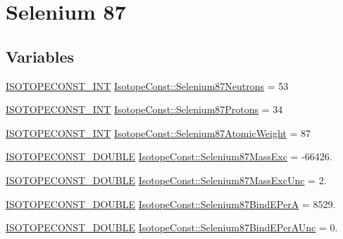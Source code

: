 \hypertarget{group___isotope_const-_selenium-_se87}{}\section{Selenium 87}
\label{group___isotope_const-_selenium-_se87}
\subsection*{Variables}
\begin{DoxyCompactItemize}
\item 
\mbox{\hyperlink{group___isotope_const-_macros_ga5f18360b3e99483a35c32d789e62621c}{I\+S\+O\+T\+O\+P\+E\+C\+O\+N\+S\+T\+\_\+\+I\+NT}} \mbox{\hyperlink{group___isotope_const-_selenium-_se87_ga31454afb7fc1f62615f207b95c50bda7}{Isotope\+Const\+::\+Selenium87\+Neutrons}} = 53
\item 
\mbox{\hyperlink{group___isotope_const-_macros_ga5f18360b3e99483a35c32d789e62621c}{I\+S\+O\+T\+O\+P\+E\+C\+O\+N\+S\+T\+\_\+\+I\+NT}} \mbox{\hyperlink{group___isotope_const-_selenium-_se87_gababb419b94bc3ac27b1ec3775664c155}{Isotope\+Const\+::\+Selenium87\+Protons}} = 34
\item 
\mbox{\hyperlink{group___isotope_const-_macros_ga5f18360b3e99483a35c32d789e62621c}{I\+S\+O\+T\+O\+P\+E\+C\+O\+N\+S\+T\+\_\+\+I\+NT}} \mbox{\hyperlink{group___isotope_const-_selenium-_se87_gafb610b8770290157e2038974c2f0e10c}{Isotope\+Const\+::\+Selenium87\+Atomic\+Weight}} = 87
\item 
\mbox{\hyperlink{group___isotope_const-_macros_ga8f45a7272ce02c0b4c65c44636ed719a}{I\+S\+O\+T\+O\+P\+E\+C\+O\+N\+S\+T\+\_\+\+D\+O\+U\+B\+LE}} \mbox{\hyperlink{group___isotope_const-_selenium-_se87_gad947dff19b705fae9ceb805f2832c4ef}{Isotope\+Const\+::\+Selenium87\+Mass\+Exc}} = -\/66426.
\item 
\mbox{\hyperlink{group___isotope_const-_macros_ga8f45a7272ce02c0b4c65c44636ed719a}{I\+S\+O\+T\+O\+P\+E\+C\+O\+N\+S\+T\+\_\+\+D\+O\+U\+B\+LE}} \mbox{\hyperlink{group___isotope_const-_selenium-_se87_gaab81e99031118309baab9f1d2d8d2784}{Isotope\+Const\+::\+Selenium87\+Mass\+Exc\+Unc}} = 2.
\item 
\mbox{\hyperlink{group___isotope_const-_macros_ga8f45a7272ce02c0b4c65c44636ed719a}{I\+S\+O\+T\+O\+P\+E\+C\+O\+N\+S\+T\+\_\+\+D\+O\+U\+B\+LE}} \mbox{\hyperlink{group___isotope_const-_selenium-_se87_gab42d7a12729e4650d895b2e3327132da}{Isotope\+Const\+::\+Selenium87\+Bind\+E\+PerA}} = 8529.
\item 
\mbox{\hyperlink{group___isotope_const-_macros_ga8f45a7272ce02c0b4c65c44636ed719a}{I\+S\+O\+T\+O\+P\+E\+C\+O\+N\+S\+T\+\_\+\+D\+O\+U\+B\+LE}} \mbox{\hyperlink{group___isotope_const-_selenium-_se87_ga1de715a3572eb0ff5f319e4255e4deca}{Isotope\+Const\+::\+Selenium87\+Bind\+E\+Per\+A\+Unc}} = 0.

\end{DoxyCompactItemize}
